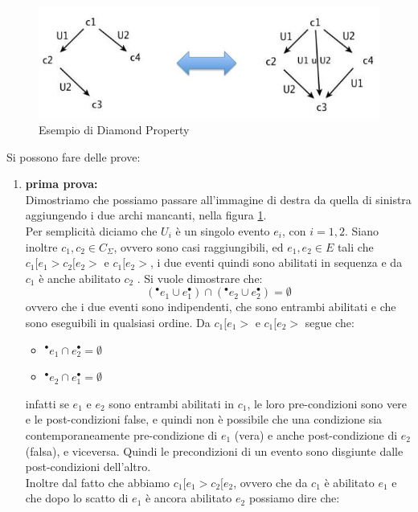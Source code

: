 \begin{esempio}
  \begin{figure}[H]
    \centering
    \includegraphics[scale = 0.6]{img/diam.jpg}
    \caption{Esempio di Diamond Property}
    \label{fig:dia}
  \end{figure}
Si possono fare delle prove:
\begin{enumerate}
  \item \textbf{prima prova:}\\
  Dimostriamo che possiamo passare all'immagine di destra da quella di sinistra
  aggiungendo i due archi mancanti, nella figura \ref{fig:dia}.\\
  Per semplicità diciamo che $U_i$ è un singolo evento $e_i$, con $i=1, 2$. Siano
  inoltre $c_1, c_2\in C_\Sigma$, ovvero sono casi raggiungibili, ed $e_1, e_2\in
  E$ tali che $c_1 [e_1 > c_2 [e_2 > \mbox{ e } c_1 [e_2 >$, i due eventi quindi
  sono abilitati in sequenza e da $c_1$ è anche abilitato $c_2$ . Si vuole
  dimostrare che: 
  \[(^\bullet e_1\cup e_1^\bullet)\cap(^\bullet e_2\cup e_2^\bullet)=\emptyset\]
  ovvero che i due eventi sono indipendenti, che sono entrambi abilitati e che
  sono eseguibili in qualsiasi ordine.
  \newpage
  Da $c_1 [e_1 > \mbox{ e }c_1 [e_2 >$ segue che:
  \begin{itemize}
    \item $^\bullet e_1\cap e_2^\bullet=\emptyset$
    \item $^\bullet e_2\cap e_1^\bullet=\emptyset$
  \end{itemize}
  infatti se $e_1$ e $e_2$ sono entrambi abilitati in $c_1$, le loro
  pre-condizioni sono vere e le post-condizioni false, e quindi non è possibile
  che una condizione sia contemporaneamente pre-condizione di $e_1$ (vera) e
  anche post-condizione di $e_2$ (falsa), e viceversa. Quindi le precondizioni
  di un evento sono disgiunte dalle post-condizioni dell'altro.\\
  Inoltre dal fatto che abbiamo $c_1 [e_1 > c_2 [e_2$, ovvero che da $c_1$ è
  abilitato $e_1$ e che dopo lo scatto di $e_1$ è ancora abilitato $e_2$
  possiamo dire che:

\end{enumerate}
\end{esempio}

